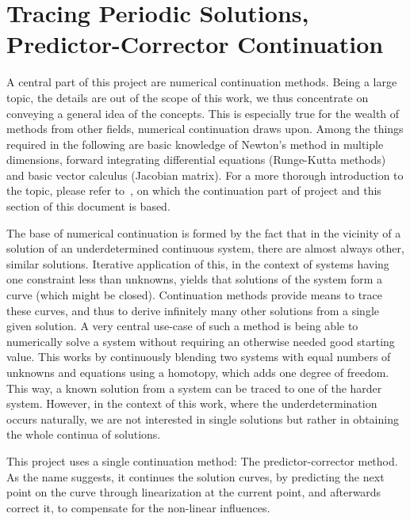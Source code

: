 \section{Tracing Periodic Solutions, Predictor-Corrector Continuation}
\label{sec:cont}

A central part of this project are numerical continuation methods.
Being a large topic, the details are out of the scope of this work, we thus concentrate on conveying a general idea of the concepts.
This is especially true for the wealth of methods from other fields, numerical continuation draws upon.
Among the things required in the following are basic knowledge of Newton's method in multiple dimensions, forward integrating differential equations (Runge-Kutta methods) and basic vector calculus (Jacobian matrix).
For a more thorough introduction to the topic, please refer to~\cite{allgower1990numerical}, on which the continuation part of project and this section of this document is based.

The base of numerical continuation is formed by the fact that in the vicinity of a solution of an underdetermined continuous system, there are almost always other, similar solutions.
Iterative application of this, in the context of systems having one constraint less than unknowns, yields that solutions of the system form a curve (which might be closed).
Continuation methods provide means to trace these curves, and thus to derive infinitely many other solutions from a single given solution.
A very central use-case of such a method is being able to numerically solve a system without requiring an otherwise needed good starting value.
This works by continuously blending two systems with equal numbers of unknowns and equations using a homotopy, which adds one degree of freedom.
This way, a known solution from a system can be traced to one of the harder system.
However, in the context of this work, where the underdetermination occurs naturally, we are not interested in single solutions but rather in obtaining the whole continua of solutions.

This project uses a single continuation method: The predictor-corrector method.
As the name suggests, it continues the solution curves, by predicting the next point on the curve through linearization at the current point, and afterwards correct it, to compensate for the non-linear influences.


